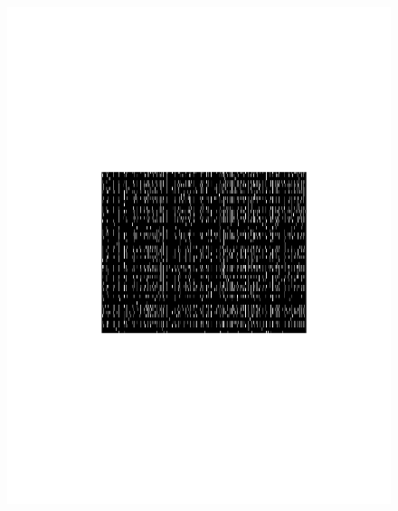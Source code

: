 \begin{figure}
\begin{minipage}[c]{0.45\hsize}
\includegraphics[width=\hsize]{../figs/Figure7a_raster_strong}
\end{minipage}
\begin{minipage}[c]{0.45\hsize}

\end{minipage}
\end{figure}
